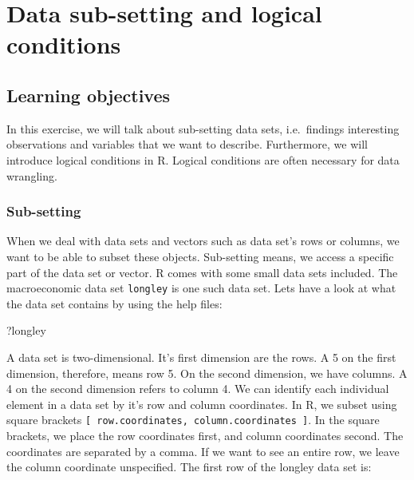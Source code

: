 \documentclass[]{article}
\newenvironment{Shaded}{\begin{snugshade}}{\end{snugshade}}
\newcommand{\NormalTok}[1]{#1}
\begin{document}
\hypertarget{data-sub-setting-and-logical-conditions}{%
\section{Data sub-setting and logical conditions}\label{data-sub-setting-and-logical-conditions}}

\hypertarget{learning-objectives}{%
\subsection{Learning objectives}\label{learning-objectives}}

In this exercise, we will talk about sub-setting data sets, i.e.~findings interesting observations and variables that we want to describe. Furthermore, we will introduce logical conditions in R. Logical conditions are often necessary for data wrangling.

\hypertarget{sub-setting}{%
\subsubsection{Sub-setting}\label{sub-setting}}

When we deal with data sets and vectors such as data set's rows or columns, we want to be able to subset these objects. Sub-setting means, we access a specific part of the data set or vector. R comes with some small data sets included. The macroeconomic data set \texttt{longley} is one such data set. Lets have a look at what the data set contains by using the help files:

\begin{Shaded}
\begin{Highlighting}[]
\NormalTok{?longley}
\end{Highlighting}
\end{Shaded}

A data set is two-dimensional. It's first dimension are the rows. A 5 on the first dimension, therefore, means row 5. On the second dimension, we have columns. A 4 on the second dimension refers to column 4. We can identify each individual element in a data set by it's row and column coordinates. In R, we subset using square brackets \texttt{{[}\ row.coordinates,\ column.coordinates\ {]}}. In the square brackets, we place the row coordinates first, and column coordinates second. The coordinates are separated by a comma. If we want to see an entire row, we leave the column coordinate unspecified. The first row of the longley data set is:
\end{document}
